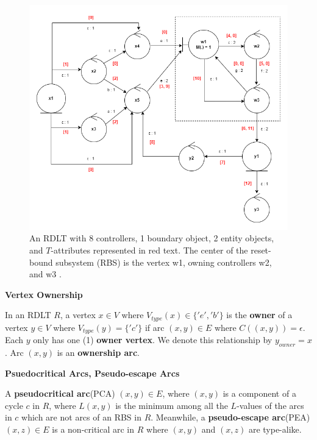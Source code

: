 \documentclass[12pt]{article}
\begin{document}
    \begin{figure}[h]
        \centering
        \includegraphics[scale=0.65]{figures/RDLT2_PJS.png}
        \caption{An RDLT with 8 controllers, 1 boundary object, 2 entity objects, and $T$-attributes represented in red text. The center of the reset-bound subsystem (RBS) is the vertex w1, owning controllers w2, and w3 \cite{malinao-pjs}.}
        \label{rdlt2}
    \end{figure} \par

    \begin{definition} \textbf{Vertex Ownership} \cite{yiu}

    In an RDLT $R$, a vertex $x \in V$ where $V_{type}(x) \in \{'e','b'\}$ is the \textbf{owner} of a vertex $y \in V$ where $V_{type}(y) = \{'c'\}$ if arc $ (x,y) \in E $ where $ C((x,y)) = \epsilon $. Each $y$ only has one (1) \textbf{owner vertex}. We denote this relationship by $y_{owner} = x $. Arc $ (x,y) $ is an \textbf{ownership arc}.

    \end{definition}

    \begin{definition} \textbf{Psuedocritical Arcs, Pseudo-escape Arcs} \cite{malinao-wctp}

    A \textbf{pseudocritical arc}(PCA) $(x,y)\in E$, where $(x,y)$ is a component of a cycle $c$ in $R$, where $L(x,y)$ is the minimum among all the $L$-values of the arcs in $c$ which are not arcs of an RBS in $R$.
    Meanwhile, a \textbf{pseudo-escape arc}(PEA) $(x,z) \in E$ is a non-critical arc in $R$ where $(x,y)$ and $(x,z)$ are type-alike.

    \end{definition}
\end{document}

